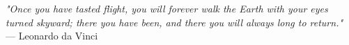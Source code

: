 \begin{flushright}
\emph{"Once you have tasted flight, you will forever walk the Earth with your eyes turned skyward; there you have been, and there you will always long to return."}\\
--- Leonardo da Vinci
\end{flushright}